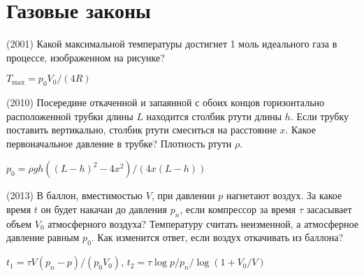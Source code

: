 \section{Газовые законы}

\begin{ex} 
(2001) Какой максимальной температуры достигнет 1 моль идеального газа в процессе, изображенном на рисунке? 
\begin{center}
\end{center}
\begin{ans}
$T_{\max}=p_0V_0/(4R)$
\end{ans}
\end{ex}

\begin{ex}
(2010) Посередине откаченной и запаянной с обоих концов горизонтально расположенной трубки длины $L$ находится столбик ртути длины $h$. 
Если трубку поставить вертикально, столбик ртути смеситься на расстояние $x$. Какое первоначальное давление в трубке? Плотность ртути $\rho$.
\begin{ans}
$p_0 = \rho g h \left( (L-h)^2 - 4x^2 \right)/ (4x(L-h))$
\end{ans}
\end{ex}

\begin{ex}
(2013) В баллон, вместимостью $V$, при давлении $p$ нагнетают воздух. За какое время $t$ он будет накачан до давления $p_n$, если компрессор за время $\tau$ засасывает объем $V_0$ атмосферного воздуха? 
Температуру считать неизменной, а атмосферное давление равным $p_0$. Как изменится ответ, если воздух откачивать из баллона?
\begin{ans}
$t_1 = \tau V(p_n-p)/(p_0V_0)$, $t_2 = \tau \log p/p_n /\log (1+V_0/V)$
\end{ans}
\end{ex}

